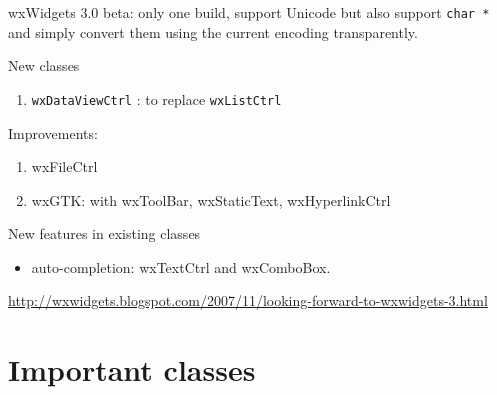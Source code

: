 wxWidgets 3.0 beta: only one build, support Unicode but also support \verb!char *! and
simply convert them using the current encoding transparently.

New classes
\begin{enumerate}
  \item \verb!wxDataViewCtrl! : to replace \verb!wxListCtrl!
\end{enumerate}

Improvements:
\begin{enumerate}
  \item wxFileCtrl 
  \item wxGTK: with wxToolBar, wxStaticText, wxHyperlinkCtrl
  
\end{enumerate}

New features in existing classes
\begin{itemize}
  \item auto-completion: wxTextCtrl and wxComboBox.
\end{itemize}

\url{http://wxwidgets.blogspot.com/2007/11/looking-forward-to-wxwidgets-3.html}

\section{Important classes}

